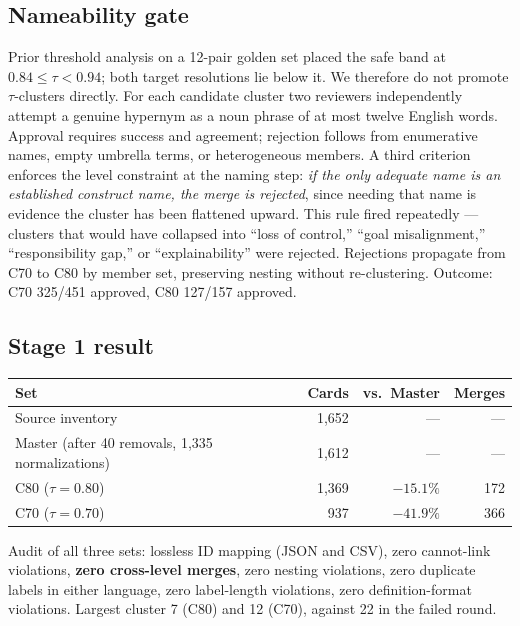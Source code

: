 \documentclass[11pt,a4paper]{article}
\begin{document}
\subsection{Nameability gate}

Prior threshold analysis on a 12-pair golden set placed the safe band at $0.84 \leq \tau < 0.94$; both target resolutions lie below it. We therefore do not promote $\tau$-clusters directly. For each candidate cluster two reviewers independently attempt a genuine hypernym as a noun phrase of at most twelve English words. Approval requires success and agreement; rejection follows from enumerative names, empty umbrella terms, or heterogeneous members. A third criterion enforces the level constraint at the naming step: \emph{if the only adequate name is an established construct name, the merge is rejected}, since needing that name is evidence the cluster has been flattened upward. This rule fired repeatedly --- clusters that would have collapsed into ``loss of control,'' ``goal misalignment,'' ``responsibility gap,'' or ``explainability'' were rejected. Rejections propagate from C70 to C80 by member set, preserving nesting without re-clustering. Outcome: C70 325/451 approved, C80 127/157 approved.

\subsection{Stage 1 result}

\begin{table}[h]
\centering\small
\begin{tabular}{@{}lrrr@{}}
\toprule
Set & Cards & vs.\ Master & Merges \\
\midrule
Source inventory & 1{,}652 & --- & --- \\
Master (after 40 removals, 1{,}335 normalizations) & 1{,}612 & --- & --- \\
C80 ($\tau=0.80$) & 1{,}369 & $-15.1\%$ & 172 \\
C70 ($\tau=0.70$) & 937 & $-41.9\%$ & 366 \\
\bottomrule
\end{tabular}
\end{table}

Audit of all three sets: lossless ID mapping (JSON and CSV), zero cannot-link violations, \textbf{zero cross-level merges}, zero nesting violations, zero duplicate labels in either language, zero label-length violations, zero definition-format violations. Largest cluster 7 (C80) and 12 (C70), against 22 in the failed round.
\end{document}
